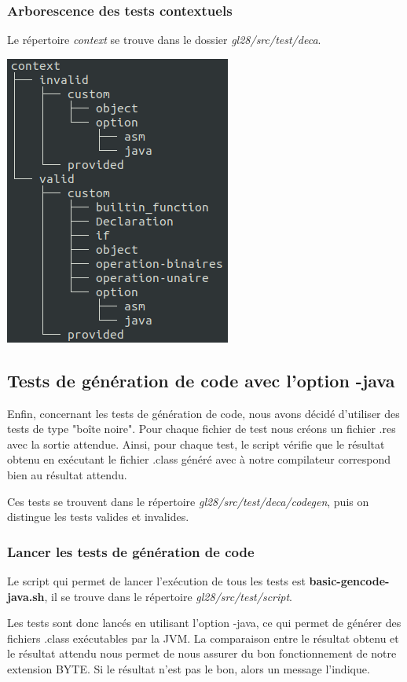 \documentclass[12pt, a4paper, one side]{article}
\begin{document}
    \subsubsection{Arborescence des tests contextuels}
    Le répertoire \textit{context} se trouve dans le dossier \textit{gl28/src/test/deca}.
    \begin{center}
        \includegraphics[scale=0.7]{treecontext.png}
    \end{center}


    \subsection{Tests de génération de code avec l'option -java}
    Enfin, concernant les tests de génération de code, nous avons décidé d'utiliser des tests de type "boîte noire". Pour chaque fichier de test nous créons un fichier .res avec la sortie attendue. Ainsi, pour chaque test, le script vérifie que le résultat obtenu en exécutant le fichier .class généré avec à notre compilateur correspond bien au résultat attendu.
    \begin{flushleft}
        Ces tests se trouvent dans le répertoire \textit{gl28/src/test/deca/codegen}, puis on distingue les tests valides et invalides.
    \end{flushleft}
    \subsubsection{Lancer les tests de génération de code}
    Le script qui permet de lancer l'exécution de tous les tests est \textbf{basic-gencode-java.sh}, il se trouve dans le répertoire \textit{gl28/src/test/script}.
    \begin{flushleft}Les tests sont donc lancés en utilisant l'option -java, ce qui permet de générer des fichiers .class exécutables par la JVM. La comparaison entre le résultat obtenu et le résultat attendu nous permet de nous assurer du bon fonctionnement de notre extension BYTE. Si le résultat n'est pas le bon, alors un message l'indique.
    \end{flushleft}
\end{document}

